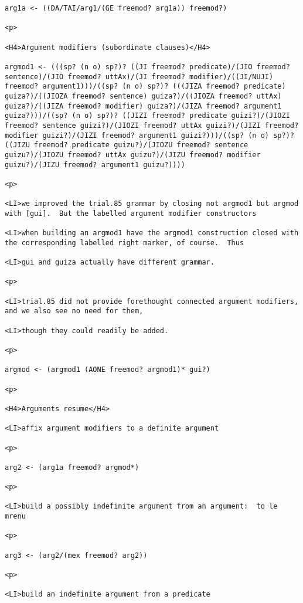 \documentclass[12pt]{article}
\begin{document}
\begin{lstlisting}
arg1a <- ((DA/TAI/arg1/(GE freemod? arg1a)) freemod?)

<p>

<H4>Argument modifiers (subordinate clauses)</H4>

argmod1 <- (((sp? (n o) sp?)? ((JI freemod? predicate)/(JIO freemod? sentence)/(JIO freemod? uttAx)/(JI freemod? modifier)/((JI/NUJI) freemod? argument1)))/((sp? (n o) sp?)? (((JIZA freemod? predicate) guiza?)/((JIOZA freemod? sentence) guiza?)/((JIOZA freemod? uttAx) guiza?)/((JIZA freemod? modifier) guiza?)/(JIZA freemod? argument1 guiza?)))/((sp? (n o) sp?)? ((JIZI freemod? predicate guizi?)/(JIOZI freemod? sentence guizi?)/(JIOZI freemod? uttAx guizi?)/(JIZI freemod? modifier guizi?)/(JIZI freemod? argument1 guizi?)))/((sp? (n o) sp?)? ((JIZU freemod? predicate guizu?)/(JIOZU freemod? sentence guizu?)/(JIOZU freemod? uttAx guizu?)/(JIZU freemod? modifier guizu?)/(JIZU freemod? argument1 guizu?))))

<p>

<LI>we improved the trial.85 grammar by closing not argmod1 but argmod with [gui].  But the labelled argument modifier constructors

<LI>when building an argmod1 have the argmod1 construction closed with the corresponding labelled right marker, of course.  Thus

<LI>gui and guiza actually have different grammar.

<p>

<LI>trial.85 did not provide forethought connected argument modifiers, and we also see no need for them,

<LI>though they could readily be added.

<p>

argmod <- (argmod1 (AONE freemod? argmod1)* gui?)

<p>

<H4>Arguments resume</H4>

<LI>affix argument modifiers to a definite argument

<p>

arg2 <- (arg1a freemod? argmod*)

<p>

<LI>build a possibly indefinite argument from an argument:  to le mrenu

<p>

arg3 <- (arg2/(mex freemod? arg2))

<p>

<LI>build an indefinite argument from a predicate


\end{lstlisting}
\end{document}
